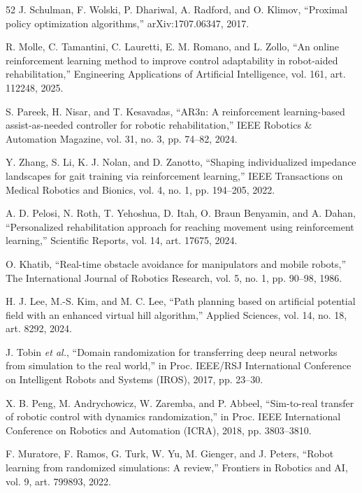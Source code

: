 \documentclass[journal,twoside,web]{ieeecolor2}
\begin{document}
\begin{thebibliography}{52}
\label{bib:b28} J. Schulman, F. Wolski, P. Dhariwal, A. Radford, and O. Klimov, ``Proximal policy optimization algorithms,'' arXiv:1707.06347, 2017.

\label{bib:b29} R. Molle, C. Tamantini, C. Lauretti, E. M. Romano, and L. Zollo, ``An online reinforcement learning method to improve control adaptability in robot-aided rehabilitation,'' Engineering Applications of Artificial Intelligence, vol. 161, art. 112248, 2025.

\label{bib:b30} S. Pareek, H. Nisar, and T. Kesavadas, ``AR3n: A reinforcement learning-based assist-as-needed controller for robotic rehabilitation,'' IEEE Robotics \& Automation Magazine, vol. 31, no. 3, pp. 74--82, 2024.

\label{bib:b31} Y. Zhang, S. Li, K. J. Nolan, and D. Zanotto, ``Shaping individualized impedance landscapes for gait training via reinforcement learning,'' IEEE Transactions on Medical Robotics and Bionics, vol. 4, no. 1, pp. 194--205, 2022.

\label{bib:b32} A. D. Pelosi, N. Roth, T. Yehoshua, D. Itah, O. Braun Benyamin, and A. Dahan, ``Personalized rehabilitation approach for reaching movement using reinforcement learning,'' Scientific Reports, vol. 14, art. 17675, 2024.

\label{bib:b33} O. Khatib, ``Real-time obstacle avoidance for manipulators and mobile robots,'' The International Journal of Robotics Research, vol. 5, no. 1, pp. 90--98, 1986.

\label{bib:b34} H. J. Lee, M.-S. Kim, and M. C. Lee, ``Path planning based on artificial potential field with an enhanced virtual hill algorithm,'' Applied Sciences, vol. 14, no. 18, art. 8292, 2024.

\label{bib:b35} J. Tobin \emph{et al.}, ``Domain randomization for transferring deep neural networks from simulation to the real world,'' in Proc. IEEE/RSJ International Conference on Intelligent Robots and Systems (IROS), 2017, pp. 23--30.

\label{bib:b36} X. B. Peng, M. Andrychowicz, W. Zaremba, and P. Abbeel, ``Sim-to-real transfer of robotic control with dynamics randomization,'' in Proc. IEEE International Conference on Robotics and Automation (ICRA), 2018, pp. 3803--3810.

\label{bib:b37} F. Muratore, F. Ramos, G. Turk, W. Yu, M. Gienger, and J. Peters, ``Robot learning from randomized simulations: A review,'' Frontiers in Robotics and AI, vol. 9, art. 799893, 2022.


\end{thebibliography}
\end{document}
